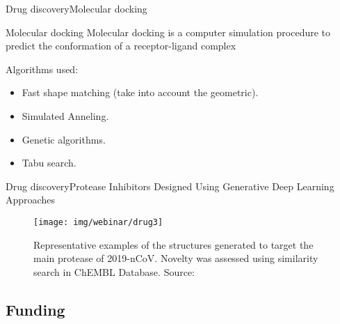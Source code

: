 \documentclass[10pt]{beamer}
\newcommand{\1}{
        	\setbeamertemplate{background}{
        		\texttt{[image: img/1]}
        		\tikz[overlay] \fill[fill opacity=0.75,fill=white] (0,0) rectangle (-\paperwidth,\paperheight);
        	}
}
\begin{document}
\begin{frame}{Drug discovery}{Molecular docking}
	\begin{block}{Molecular docking}
		Molecular docking is a computer simulation procedure to
		predict the conformation of a receptor-ligand complex \cite{dias2008molecular}
	\end{block}

	\begin{block}{}
		Algorithms used:
		\begin{itemize}
			\item Fast shape matching (take into account the geometric).
			\item Simulated Anneling.
			\item Genetic algorithms.
			\item Tabu search.
		\end{itemize}
	\end{block}
\end{frame}



\begin{frame}{Drug discovery}{Protease Inhibitors Designed Using Generative Deep Learning Approaches}
	\begin{figure}[]
		\centering
		\texttt{[image: img/webinar/drug3]}
		\label{img:mot2}
		\caption{Representative examples of the structures generated to target the main protease of
			2019-nCoV. Novelty was assessed using similarity search in ChEMBL Database. Source: \cite{Zhavoronkov2020}}
	\end{figure}
\end{frame}



\subsection{Funding}
\end{document}
